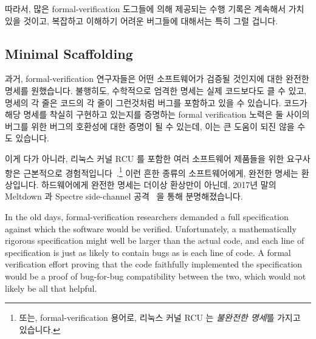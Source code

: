 따라서, 많은 formal-verification 도그들에 의해 제공되는 수행 기록은 계속해서
가치있을 것이고, 복잡하고 이해하기 어려운 버그들에 대해서는 특히 그럴 겁니다.
\iffalse

All that aside, people writing formal-verification tools are
permitted to leverage existing tools.
For example, a tool designed to determine only the presence
or absence of a serious but rare bug might leverage bisection.
If an old version of the program under test did not contain the bug,
but a new version did, then bisection could be used to quickly
locate the commit that inserted the bug, which might be
sufficient information to find and fix the bug.
Of course, this sort of strategy would not work well for common
bugs because in this case bisection would fail due to all commits
having at least one instance of the common bug.

Therefore, the execution traces provided
by many formal-verification tools will continue to be valuable,
particularly for complex and difficult-to-understand bugs.
\fi

\subsection{Minimal Scaffolding}
\label{sec:future:Minimal Scaffolding}

과거, formal-verification 연구자들은 어떤 소프트웨어가 검증될 것인지에 대한
완전한 명세를 원했습니다.
불행히도, 수학적으로 엄격한 명세는 실제 코드보다도 클 수 있고, 명세의 각 줄은
코드의 각 줄이 그런것처럼 버그를 포함하고 있을 수 있습니다.
코드가 해당 명세를 착실히 구현하고 있는지를 증명하는 formal verification 노력은
둘 사이의 버그를 위한 버그의 호환성에 대한 증명이 될 수 있는데, 이는 큰 도움이
되진 않을 수도 있습니다.

이게 다가 아니라, 리눅스 커널 RCU 를 포함한 여러 소프트웨어 제품들을 위한
요구사항은 근본적으로
경험적입니다~\cite{PaulEMcKenney2015RCUreqts1,PaulEMcKenney2015RCUreqts2,PaulEMcKenney2015RCUreqts3}.\footnote{
	또는, formal-verification 용어로, 리눅스 커널 RCU 는 \emph{불완전한
	명세}를 가지고 있습니다.}
이런 흔한 종류의 소프트웨어에게, 완전한 명세는 환상입니다.
하드웨어에게 완전한 명세는 더이상 환상만이 아닌데, 2017년 말의 Meltdown 과
Spectre side-channel 공격~\cite{JannHorn2018MeltdownSpectre} 을 통해
분명해졌습니다.
\iffalse

In the old days, formal-verification researchers demanded a full
specification against which the software would be verified.
Unfortunately, a mathematically rigorous specification might well
be larger than the actual code, and each line of specification
is just as likely to contain bugs as is each line of code.
A formal verification effort proving that the code faithfully
implemented the specification would be a proof of bug-for-bug
compatibility between the two, which would not likely be all
that helpful.

